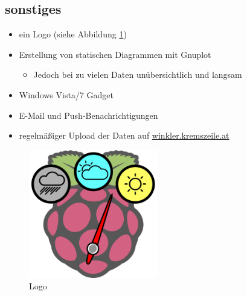 \subsection{sonstiges}
\label{subsec:sonstiges}

\begin{itemize}
	\item ein Logo (siehe Abbildung \ref{fig:logo})
	\item Erstellung von statischen Diagrammen mit Gnuplot
	\begin{itemize}
		\item Jedoch bei zu vielen Daten unübersichtlich und langsam
	\end{itemize}
	\item Windows Vista/7 Gadget
	\item E-Mail und Push-Benachrichtigungen
	\item regelmäßiger Upload der Daten auf \href{http://winkler.kremszeile.at}{winkler.kremszeile.at}
\end{itemize}

\begin{figure}[h]
  \centering
     \includegraphics[width=0.5\textwidth]{figures/logo.png}
  \caption{Logo}
  \label{fig:logo}
\end{figure}